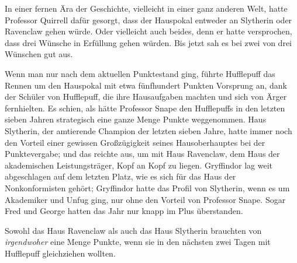 In einer fernen Ära der Geschichte, vielleicht in einer ganz anderen Welt, hatte Professor Quirrell dafür gesorgt, dass der Hauspokal entweder an Slytherin oder Ravenclaw gehen würde. Oder vielleicht auch beides, denn er hatte versprochen, dass drei Wünsche in Erfüllung gehen würden. Bis jetzt sah es bei zwei von drei Wünschen gut aus.

Wenn man nur nach dem aktuellen Punktestand ging, führte Hufflepuff das Rennen um den Hauspokal mit etwa fünfhundert Punkten Vorsprung an, dank der Schüler von Hufflepuff, die ihre Hausaufgaben machten und sich von Ärger fernhielten. Es schien, als hätte Professor Snape den Hufflepuffs in den letzten sieben Jahren strategisch eine ganze Menge Punkte weggenommen. Haus Slytherin, der amtierende Champion der letzten sieben Jahre, hatte immer noch den Vorteil einer gewissen Großzügigkeit seines Hausoberhauptes bei der Punktevergabe; und das reichte aus, um mit Haus Ravenclaw, dem Haus der akademischen Leistungsträger, Kopf an Kopf zu liegen. Gryffindor lag weit abgeschlagen auf dem letzten Platz, wie es sich für das Haus der Nonkonformisten gehört; Gryffindor hatte das Profil von Slytherin, wenn es um Akademiker und Unfug ging, nur ohne den Vorteil von Professor Snape. Sogar Fred und George hatten das Jahr nur knapp im Plus überstanden.

Sowohl das Haus Ravenclaw als auch das Haus Slytherin brauchten von \emph{irgendwoher} eine Menge Punkte, wenn sie in den nächsten zwei Tagen mit Hufflepuff gleichziehen wollten.

